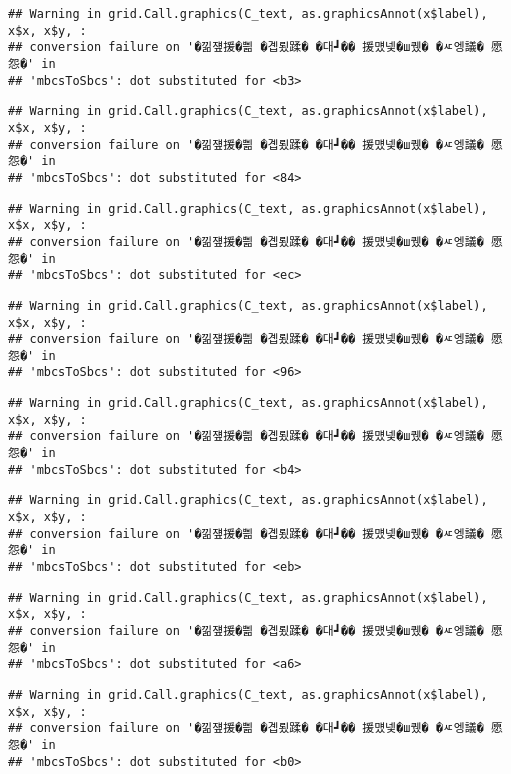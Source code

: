 \documentclass[
]{article}
\begin{document}
\begin{verbatim}
## Warning in grid.Call.graphics(C_text, as.graphicsAnnot(x$label), x$x, x$y, :
## conversion failure on '�낆쟾援�쁾 �곕룄蹂� �대┛�� 援먰넻�ш퀬� �ㅼ엥議� 愿怨�' in
## 'mbcsToSbcs': dot substituted for <b3>
\end{verbatim}

\begin{verbatim}
## Warning in grid.Call.graphics(C_text, as.graphicsAnnot(x$label), x$x, x$y, :
## conversion failure on '�낆쟾援�쁾 �곕룄蹂� �대┛�� 援먰넻�ш퀬� �ㅼ엥議� 愿怨�' in
## 'mbcsToSbcs': dot substituted for <84>
\end{verbatim}

\begin{verbatim}
## Warning in grid.Call.graphics(C_text, as.graphicsAnnot(x$label), x$x, x$y, :
## conversion failure on '�낆쟾援�쁾 �곕룄蹂� �대┛�� 援먰넻�ш퀬� �ㅼ엥議� 愿怨�' in
## 'mbcsToSbcs': dot substituted for <ec>
\end{verbatim}

\begin{verbatim}
## Warning in grid.Call.graphics(C_text, as.graphicsAnnot(x$label), x$x, x$y, :
## conversion failure on '�낆쟾援�쁾 �곕룄蹂� �대┛�� 援먰넻�ш퀬� �ㅼ엥議� 愿怨�' in
## 'mbcsToSbcs': dot substituted for <96>
\end{verbatim}

\begin{verbatim}
## Warning in grid.Call.graphics(C_text, as.graphicsAnnot(x$label), x$x, x$y, :
## conversion failure on '�낆쟾援�쁾 �곕룄蹂� �대┛�� 援먰넻�ш퀬� �ㅼ엥議� 愿怨�' in
## 'mbcsToSbcs': dot substituted for <b4>
\end{verbatim}

\begin{verbatim}
## Warning in grid.Call.graphics(C_text, as.graphicsAnnot(x$label), x$x, x$y, :
## conversion failure on '�낆쟾援�쁾 �곕룄蹂� �대┛�� 援먰넻�ш퀬� �ㅼ엥議� 愿怨�' in
## 'mbcsToSbcs': dot substituted for <eb>
\end{verbatim}

\begin{verbatim}
## Warning in grid.Call.graphics(C_text, as.graphicsAnnot(x$label), x$x, x$y, :
## conversion failure on '�낆쟾援�쁾 �곕룄蹂� �대┛�� 援먰넻�ш퀬� �ㅼ엥議� 愿怨�' in
## 'mbcsToSbcs': dot substituted for <a6>
\end{verbatim}

\begin{verbatim}
## Warning in grid.Call.graphics(C_text, as.graphicsAnnot(x$label), x$x, x$y, :
## conversion failure on '�낆쟾援�쁾 �곕룄蹂� �대┛�� 援먰넻�ш퀬� �ㅼ엥議� 愿怨�' in
## 'mbcsToSbcs': dot substituted for <b0>
\end{verbatim}
\end{document}

